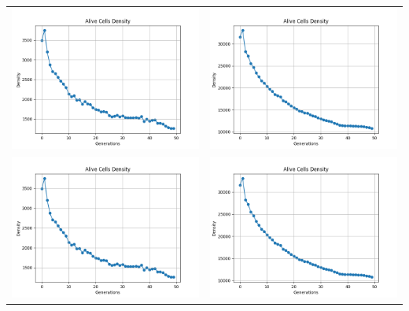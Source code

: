\documentclass[]{article}
\begin{document}
			\begin{table}[!h]
				\centering
				\begin{tabular}{c c}
					\includegraphics[width=9cm]{Imagenes/Densidad_100x100_50Gen.png} & \includegraphics[width=9cm]{Imagenes/Densidad_300x300_50Gen.png} \\
					\includegraphics[width=9cm]{Imagenes/Densidad_100x100_50Gen.png} & \includegraphics[width=9cm]{Imagenes/Densidad_300x300_50Gen.png} 

\end{tabular}
\end{table}
\end{document}

